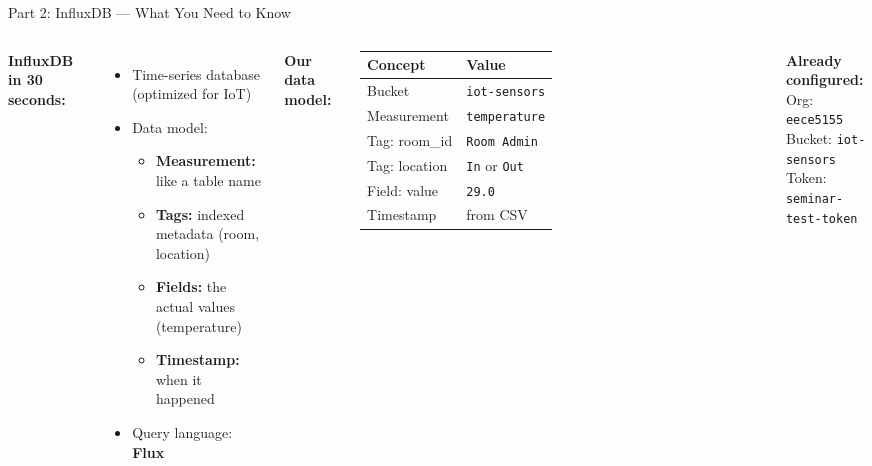 \documentclass[aspectratio=169,11pt]{beamer}
\begin{document}
\begin{frame}{Part 2: InfluxDB --- What You Need to Know}
    \begin{columns}
        \textbf{InfluxDB in 30 seconds:}
        \begin{itemize}
            \item Time-series database (optimized for IoT)
            \item Data model:
            \begin{itemize}
                \item \textbf{Measurement:} like a table name
                \item \textbf{Tags:} indexed metadata (room, location)
                \item \textbf{Fields:} the actual values (temperature)
                \item \textbf{Timestamp:} when it happened
            \end{itemize}
            \item Query language: \textbf{Flux}
        \end{itemize}

        \textbf{Our data model:}

        \vspace{0.1cm}
        \footnotesize
        \begin{tabular}{ll}
            \toprule
            \textbf{Concept} & \textbf{Value} \\
            \midrule
            Bucket & \texttt{iot-sensors} \\
            Measurement & \texttt{temperature} \\
            Tag: room\_id & \texttt{Room Admin} \\
            Tag: location & \texttt{In} or \texttt{Out} \\
            Field: value & \texttt{29.0} \\
            Timestamp & from CSV \\
            \bottomrule
        \end{tabular}
        \normalsize

        \vspace{0.2cm}
        \textbf{Already configured:}\\
        {\small Org: \texttt{eece5155}\\
        Bucket: \texttt{iot-sensors}\\
        Token: \texttt{seminar-test-token}}
    \end{columns}
\end{frame}
\end{document}
